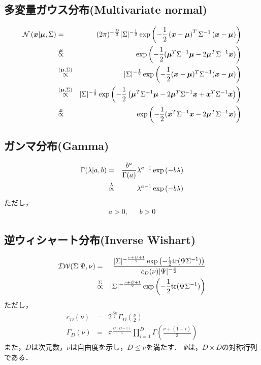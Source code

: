 \documentclass[a4j]{jarticle}
\begin{document}
\subsection{多変量ガウス分布(Multivariate normal)}
\begin{eqnarray}
\operatorname{\mathcal{N}}{(\boldsymbol{x} | \boldsymbol{\mu}, \Sigma)} &=& (2 \pi)^{- \frac{D}{2}} |\Sigma|^{-\frac{1}{2}} \exp{\left( -\frac{1}{2} \left( \boldsymbol{x} - \boldsymbol{\mu}\right)^T \Sigma^{-1} \left( \boldsymbol{x} - \boldsymbol{\mu}\right) \right)} \label{MultivariateNormal}\\
&\overset{\boldsymbol{\mu}}{\propto}& \exp{\left( -\frac{1}{2}(\boldsymbol{\mu}^T\Sigma^{-1}\boldsymbol{\mu} - 2 \boldsymbol{\mu}^T \Sigma^{-1} \boldsymbol{x}) \right)}\\
&\overset{(\boldsymbol{\mu}, \Sigma)}{\propto}& |\Sigma|^{-\frac{1}{2}} \exp{\left( -\frac{1}{2}(\boldsymbol{x} - \boldsymbol{\mu})^T\Sigma^{-1}(\boldsymbol{x} - \boldsymbol{\mu}) \right)}\\
&\overset{(\boldsymbol{\mu}, \Sigma)}{\propto}& |\Sigma|^{-\frac{1}{2}} \exp{\left( -\frac{1}{2}\left(\boldsymbol{\mu}^T \Sigma^{-1}\boldsymbol{\mu} - 2 \boldsymbol{\mu}^T \Sigma^{-1} \boldsymbol{x} + \boldsymbol{x}^T \Sigma^{-1} \boldsymbol{x}\right) \right)}\\
&\overset{\boldsymbol{x}}{\propto}& \exp{\left( -\frac{1}{2}(\boldsymbol{x}^T\Sigma^{-1}\boldsymbol{x} - 2 \boldsymbol{\mu}^T \Sigma^{-1} \boldsymbol{x}) \right)}
\end{eqnarray}

\subsection{ガンマ分布(Gamma)}
\begin{eqnarray}
\Gamma(\lambda | a, b) &=& \frac{b^a}{\Gamma(a)} \lambda^{a-1} \exp\left( -b \lambda \right) \label{Gamma} \\
&\overset{\lambda}{\propto}& \lambda^{a-1} \exp\left( -b \lambda \right) 
\end{eqnarray}
ただし，
\begin{eqnarray*}
a > 0,~~~~~~~b > 0
\end{eqnarray*}

\subsection{逆ウィシャート分布(Inverse Wishart)}
\begin{eqnarray}
\operatorname{\mathcal{IW}}(\Sigma | \Psi, \nu) &=& \frac{|\Sigma|^{-\frac{\nu+D+1}{2}} \exp{\left(-\frac{1}{2}  \textrm{tr}(\Psi \Sigma^{-1})\right)}}{c_{D}(\nu) |\Psi|^{-\frac{\nu}{2}}} \label{InverseWishart}\\
&\overset{\Sigma}{\propto}&|\Sigma|^{-\frac{\nu+D+1}{2}}\exp{\left(-\frac{1}{2}  \textrm{tr}(\Psi \Sigma^{-1})\right)}
\end{eqnarray}
ただし，
\begin{eqnarray*}
c_{D}(\nu) &=& 2^\frac{D \nu}{2}　\Gamma_{D}\left(\frac{\nu}{2}\right)\\
\Gamma_{D}(\nu) &=& \pi^\frac{D (D-1)}{4} \prod_{i=1}^{D} \Gamma\left(\frac{\nu+(1-i)}{2}\right)
\end{eqnarray*}
また，$D$は次元数，$\nu$は自由度を示し，$D \leq \nu$を満たす．
$\Psi$は，$D \times D$の対称行列である．
\end{document}
